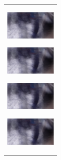 \begin{enumerate}
\begin{end}
\begin{figure}[H]
  \begin{center}
    \begin{tabular}{c}
      \begin{minipage}{0.18\hsize}
        \begin{center}
          \includegraphics[clip, width=2.5cm]{./Figures/resque_mean1.eps}
          \hspace{0.3cm} { }
        \end{center}
      \end{minipage}
      \begin{minipage}{0.18\hsize}
        \begin{center}
          \includegraphics[clip, width=2.5cm]{./Figures/resque_mean1.eps}
          \hspace{0.3cm} { }
        \end{center}
      \end{minipage}
      \begin{minipage}{0.18\hsize}
        \begin{center}
          \includegraphics[clip, width=2.5cm]{./Figures/resque_mean1.eps}
          \hspace{2.0cm} {}
        \end{center}
      \end{minipage}
      \begin{minipage}{0.18\hsize}
        \begin{center}
          \includegraphics[clip, width=2.5cm]{./Figures/resque_mean1.eps}
          \hspace{0.1cm} { }
        \end{center}
      \end{minipage}

\end{tabular}
\end{center}
\end{figure}
\end{end}
\end{enumerate}
